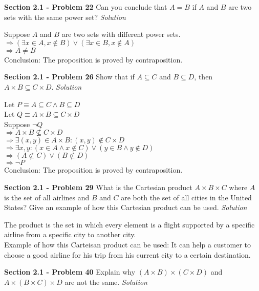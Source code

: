 \documentclass[10pt]{article}
\renewcommand{\lor}{\vee}
\renewcommand{\land}{\wedge}
\begin{document}
\clearpage
\textbf{Section 2.1 - Problem 22} Can you conclude that $A = B$ if $A$ and $B$ are two sets
with the same power set?
\bigbreak
\textit{Solution} 
\bigbreak

    Suppose $A$ and $B$ are two sets with different power sets. \\
    $\Rightarrow (\exists x \in A, x \not \in B) \lor (\exists x \in B, x \not \in A)$ \\
    $\Rightarrow A \neq B$ \\
    Conclusion: The proposition is proved by contraposition.

\clearpage
\textbf{Section 2.1 - Problem 26} Show that if $A \subseteq C$ and $B \subseteq D$, then
$A \times B \subseteq C \times D$.
\bigbreak
\textit{Solution} 
\bigbreak

    Let $P \equiv A \subseteq C \land B \subseteq D$ \\
    Let $Q \equiv A \times B \subseteq C \times D$ \\
    Suppose $\lnot Q$ \\
    $\Rightarrow A \times B \not \subseteq C \times D $ \\
    $\Rightarrow \exists (x, y) \in A \times B: (x, y) \not \in C \times D$ \\
    $\Rightarrow \exists x, y: (x \in A \land x \not \in C) \lor (y \in B \land y \not \in D)$ \\
    $\Rightarrow (A \not \subset C) \lor (B \not \subset D)$ \\
    $\Rightarrow \lnot P$ \\

    Conclusion: The proposition is proved by contraposition.

\clearpage
\textbf{Section 2.1 - Problem 29} What is the Cartesian product $A \times B \times C$ where $A$
is the set of all airlines and $B$ and $C$ are both the set of all cities in the United States?
Give an example of how this Cartesian product can be used.
\bigbreak
\textit{Solution} 
\bigbreak

    The product is the set in which every element is a flight supported by a specific airline
    from a specific city to another city. \\
    Example of how this Carteisan product can be used: It can help a customer to choose a good
    airline for his trip from his current city to a certain destination.

\clearpage
\textbf{Section 2.1 - Problem 40} Explain why $(A \times B) \times (C \times D)$ and
$A \times (B \times C) \times D$ are not the same.
\bigbreak
\textit{Solution} 
\bigbreak
\end{document}
